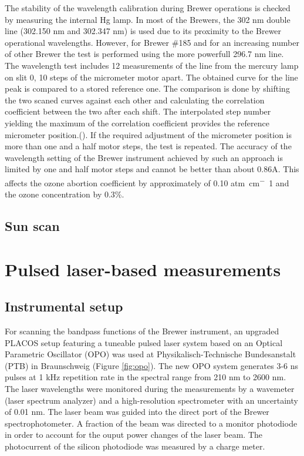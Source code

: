 \documentclass[acp]{copernicus} %
\begin{document}
   The stability of the wavelength calibration during Brewer operations is checked by measuring the internal Hg lamp. In most of the Brewers, the 302 \unit{nm} double line (302.150 nm and 302.347 nm) is used due to its proximity to the Brewer operational wavelengths. However, for Brewer \#185 and for an increasing number of other Brewer the test is  performed using the more powerfull 296.7 \unit{nm} line. The wavelength test includes 12 measurements of the line from the mercury lamp on slit 0, 10 steps of the micrometer motor apart. The obtained curve for the line peak is compared to a stored reference one. The comparison is done by shifting the two scaned curves against each other and calculating the correlation coefficient between the two after each shift. The interpolated step number yielding the maximum of the correlation coefficient provides the reference micrometer position.(\citep{savastiouk2005improvements}). If the required adjustment of the micrometer position is more than one and a half motor steps, the test is repeated. The accuracy of the wavelength setting of the Brewer instrument achieved by such an approach is limited by one and half motor steps and cannot be better than about 0.86A. This affects the ozone abortion coefficient by approximately of 0.10 \unit{atm cm^-1} and the ozone concentration by 0.3\%.
  


\subsection{Sun scan}
\citet{savastiouk2005improvements} 


\section{ Pulsed laser-based measurements}

\subsection{Instrumental setup}

For scanning the bandpass functions of the Brewer instrument, an upgraded PLACOS setup \citet{Nevas2009} featuring a tuneable pulsed laser system based on an Optical Parametric Oscillator (OPO) was used at Physikalisch-Technische Bundesanstalt (PTB) in Braunschweig  (Figure \ref{fig:opo}). The new OPO system generates 3-6 ns pulses at 1 kHz repetition rate in the spectral range from 210 \unit{nm} to 2600 \unit{nm}. The laser wavelengths were monitored during the measurements by a wavemeter (laser spectrum analyzer) and a high-resolution spectrometer with an uncertainty of 0.01 nm. The laser beam was guided into the direct port of the Brewer spectrophotometer. A fraction of the beam was directed to a monitor photodiode in order to account for the ouput power changes of the laser beam. The photocurrent of the silicon photodiode was measured by a charge meter.
\end{document}
